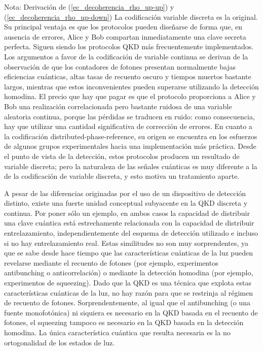 \documentclass[a4paper,11pt]{book} %
\numberwithin{equation}{chapter}
\begin{document}
\begin{mybox_blue}{Nota: Derivación de (\ref{ec_decoherencia_rho_up-up}) y  (\ref{ec_decoherencia_rho_up-down})}
La codificación variable discreta es la original. Su principal ventaja es que los protocolos pueden diseñarse de forma que, en ausencia de errores, Alice y Bob compartan inmediatamente una clave secreta perfecta. Siguen siendo los protocolos QKD más frecuentemente implementados. Los argumentos a favor de la codificación de variable continua se derivan de la observación de que los contadores de fotones presentan normalmente bajas eficiencias cuánticas, altas tasas de recuento oscuro y tiempos muertos bastante largos, mientras que estos inconvenientes pueden superarse utilizando la detección homodina. El precio que hay que pagar es que el protocolo proporciona a Alice y Bob una realización correlacionada pero bastante ruidosa de una variable aleatoria continua, porque las pérdidas se traducen en ruido: como consecuencia, hay que utilizar una cantidad significativa de corrección de errores. En cuanto a la codificación distributed-phase-reference, su origen se encuentra en los esfuerzos de algunos grupos experimentales hacia una implementación más práctica. Desde el punto de vista de la detección, estos protocolos producen un resultado de variable discreta; pero la naturaleza de las señales cuánticas es muy diferente a la de la codificación de variable discreta, y esto motiva un tratamiento aparte.

A pesar de las diferencias originadas por el uso de un dispositivo de detección distinto, existe una fuerte unidad conceptual subyacente en la QKD discreta y continua. Por poner sólo un ejemplo, en ambos casos la capacidad de distribuir una clave cuántica está estrechamente relacionada con la capacidad de distribuir entrelazamiento, independientemente del esquema de detección utilizado e incluso si no hay entrelazamiento real. Estas similitudes no son muy sorprendentes, ya que se sabe desde hace tiempo que las características cuánticas de la luz pueden revelarse mediante el recuento de fotones (por ejemplo, experimentos antibunching o anticorrelación) o mediante la detección homodina (por ejemplo, experimentos de squeezing). Dado que la QKD es una técnica que explota estas características cuánticas de la luz, no hay razón para que se restrinja al régimen de recuento de fotones. Sorprendentemente, al igual que el antibunching (o una fuente monofotónica) ni siquiera es necesario en la QKD basada en el recuento de fotones, el squeezing tampoco es necesario en la QKD basada en la detección homodina. La única característica cuántica que resulta necesaria es la no ortogonalidad de los estados de luz.


\end{mybox_blue}
\end{document}
